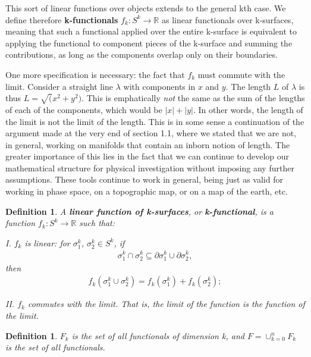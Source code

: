 \documentclass{book}
\newtheorem{defn}[equation]{Definition}
\begin{document}
This sort of linear functions over objects extends to the general kth case. We define therefore \textbf{k-functionals} $f_k : S^k \to \mathbb{R}$ as linear functionals over k-surfaces, meaning that such a functional applied over the entire k-surface is equivalent to applying the functional to component pieces of the k-surface and summing the contributions, as long as the components overlap only on their boundaries. 

One more specification is necessary: the fact that $f_k$ must commute with the limit. Consider a straight line $\lambda$ with components in $x$ and $y$. The length $L$ of $\lambda$ is thus $L = \sqrt(x^2 + y^2)$. This is emphatically \emph{not} the same as the sum of the lengths of each of the components, which would be $|x| + |y|$. In other words, the length of the limit is not the limit of the length. This is in some sense a continuation of the argument made at the very end of section 1.1, where we stated that we are not, in general, working on manifolds that contain an inborn notion of length. The greater importance of this lies in the fact that we can continue to develop our mathematical structure for physical investigation without imposing any further assumptions. These tools continue to work in general, being just as valid for working in phase space, on a topographic map, or on a map of the earth, etc. 





\begin{defn}
	A \textbf{linear function of k-surfaces}, or \textbf{k-functional}, is a function $f_k : S^k \to \mathbb{R}$ such that:
	
	I. $f_k$ is linear: for $\sigma^k_1$, $\sigma^k_2 \in S^k$, if \begin{gather}\sigma^k_1 \cap \sigma^k_2 \subseteq \partial \sigma^k_1 \cup \partial \sigma^k_2,\end{gather} then \begin{gather}f_k(\sigma^k_1\cup \sigma^k_2) = f_k(\sigma^k_1) + f_k(\sigma^k_2); \end{gather}
	
	II. $f_k$ commutes with the limit. That is, the limit of the function is the function of the limit. 
\end{defn}



\begin{defn}
	$F_k$ is the set of all functionals of dimension k, and $F = \cup_{k=0}^nF_k$ is the set of all functionals. 
\end{defn}
\end{document}
